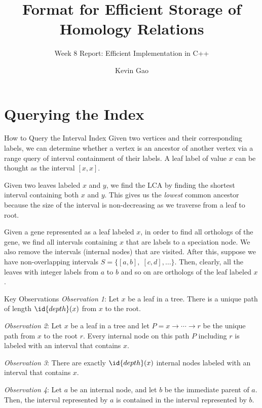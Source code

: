 \documentclass{beamer}
\title{Format for Efficient Storage of Homology Relations}
\subtitle{Week 8 Report: Efficient Implementation in C++}
\author{Kevin Gao}
\institute{University of Toronto}
\begin{document}
\frame{\titlepage}


\section{Querying the Index}

\begin{frame}{How to Query the Interval Index}
    Given two vertices and their corresponding labels, we can determine whether a vertex is an ancestor of another vertex via a range query of interval containment of their labels. A leaf label of value $x$ can be thought as the interval $[x,x]$.

    Given two leaves labeled $x$ and $y$, we find the LCA by finding the shortest interval containing both $x$ and $y$. This gives us the \textit{lowest} common ancestor because the size of the interval is non-decreasing as we traverse from a leaf to root.

    Given a gene represented as a leaf labeled $x$, in order to find all orthologs of the gene, we find all intervals containing $x$ that are labels to a speciation node. We also remove the intervals (internal nodes) that are visited. After this, suppose we have non-overlapping intervals $S = \{[a,b],\; [c,d],\ldots\}$. Then, clearly, all the leaves with integer labels from $a$ to $b$ and so on are orthologs of the leaf labeled $x$.
\end{frame}

\begin{frame}{Key Observations}
    \textit{Observation 1}: Let $x$ be a leaf in a tree. There is a unique path of length $\id{depth}(x)$ from $x$ to the root.

    \textit{Observation 2}: Let $x$ be a leaf in a tree and let $P = x \to \cdots \to r$ be the unique path from $x$ to the root $r$. Every internal node on this path $P$ including $r$ is labeled with an interval that contains $x$.

    \textit{Observation 3}: There are exactly $\id{depth}(x)$ internal nodes labeled with an interval that contains $x$.

    \textit{Observation 4}: Let $a$ be an internal node, and let $b$ be the immediate parent of $a$. Then, the interval represented by $a$ is contained in the interval represented by $b$.
\end{frame}
\end{document}
